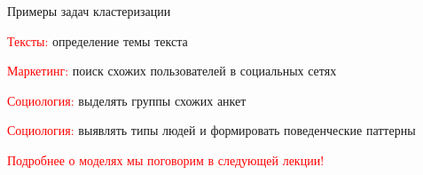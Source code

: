 \documentclass[notes,12pt, aspectratio=169]{beamer}
\newenvironment{wideitemize}{\itemize\addtolength{\itemsep}{10pt}}{\enditemize}
\begin{document}
\begin{frame}{Примеры задач кластеризации}
	\begin{wideitemize}
		\item \textcolor{red}{Тексты:} определение темы текста 
		\item \textcolor{red}{Маркетинг:} поиск схожих пользователей в социальных сетях
		\item \textcolor{red}{Социология:} выделять группы схожих анкет 
		\item \textcolor{red}{Социология:} выявлять типы людей и формировать поведенческие паттерны
	\end{wideitemize}
\end{frame}

\begin{frame}
	\begin{center}
	\textcolor{red}{Подробнее о моделях мы поговорим в следующей лекции!}
	\end{center}
\end{frame}
\end{document}
